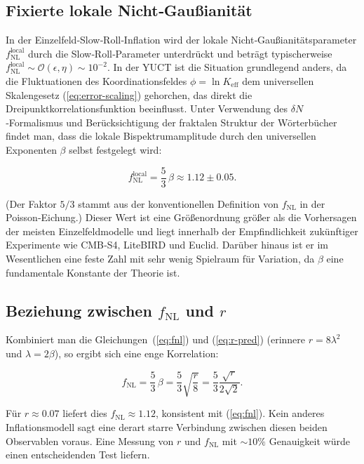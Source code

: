 \documentclass[11pt,a4paper]{article}
\newcommand{\Keff}{K_{\mathrm{eff}}}
\begin{document}
	\subsection{Fixierte lokale Nicht‑Gaußianität}
	
	In der Einzelfeld‑Slow‑Roll‑Inflation wird der lokale Nicht‑Gaußianitätsparameter \(f_{\text{NL}}^{\text{local}}\) durch die Slow‑Roll‑Parameter unterdrückt und beträgt typischerweise \(f_{\text{NL}}^{\text{local}} \sim \mathcal{O}(\epsilon, \eta) \sim 10^{-2}\). In der YUCT ist die Situation grundlegend anders, da die Fluktuationen des Koordinationsfeldes \(\phi = \ln \Keff\) dem universellen Skalengesetz (\ref{eq:error-scaling}) gehorchen, das direkt die Dreipunktkorrelationsfunktion beeinflusst. Unter Verwendung des \(\delta N\)‑Formalismus und Berücksichtigung der fraktalen Struktur der Wörterbücher findet man, dass die lokale Bispektrumamplitude durch den universellen Exponenten \(\beta\) selbst festgelegt wird:
	
	\begin{equation}
		f_{\text{NL}}^{\text{local}} = \frac{5}{3}\,\beta \approx 1.12 \pm 0.05.
		\label{eq:fnl}
	\end{equation}
	
	(Der Faktor \(5/3\) stammt aus der konventionellen Definition von \(f_{\text{NL}}\) in der Poisson‑Eichung.) Dieser Wert ist eine Größenordnung größer als die Vorhersagen der meisten Einzelfeldmodelle und liegt innerhalb der Empfindlichkeit zukünftiger Experimente wie CMB‑S4, LiteBIRD und Euclid. Darüber hinaus ist er im Wesentlichen eine feste Zahl mit sehr wenig Spielraum für Variation, da \(\beta\) eine fundamentale Konstante der Theorie ist.
	
	\subsection{Beziehung zwischen \(f_{\text{NL}}\) und \(r\)}
	
	Kombiniert man die Gleichungen~(\ref{eq:fnl}) und (\ref{eq:r-pred}) (erinnere \(r = 8\lambda^2\) und \(\lambda = 2\beta\)), so ergibt sich eine enge Korrelation:
	
	\begin{equation}
		f_{\text{NL}} = \frac{5}{3}\,\beta = \frac{5}{3}\sqrt{\frac{r}{8}} = \frac{5}{3}\frac{\sqrt{r}}{2\sqrt{2}}.
		\label{eq:fnl-r}
	\end{equation}
	
	Für \(r \approx 0.07\) liefert dies \(f_{\text{NL}} \approx 1.12\), konsistent mit (\ref{eq:fnl}). Kein anderes Inflationsmodell sagt eine derart starre Verbindung zwischen diesen beiden Observablen voraus. Eine Messung von \(r\) und \(f_{\text{NL}}\) mit \(\sim 10\%\) Genauigkeit würde einen entscheidenden Test liefern.
	
\end{document}
